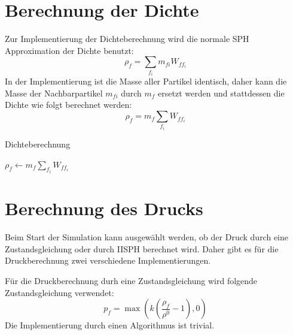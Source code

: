 \documentclass[11pt,
a4paper,
parskip=half, %
BCOR=10mm, %
english,
ngerman]{scrreprt}
\begin{document}
\section{Berechnung der Dichte}
Zur Implementierung der Dichteberechnung wird die normale SPH Approximation der Dichte benutzt:
\begin{equation}
    \rho_f = \sum_{f_i} m_{fi} W_{f f_i}
\end{equation}
In der Implementierung ist die Masse aller Partikel identisch, daher kann die Masse der Nachbarpartikel $m_{fi}$ durch $m_f$ ersetzt werden
und stattdessen die Dichte wie folgt berechnet werden:
\begin{equation}
    \rho_f = m_f \sum_{f_i} W_{f f_i}
\end{equation}

\begin{algorithm}
    \caption{Dichteberechnung}
    \label{alg:density}
    \begin{algorithmic}
            \State $\rho_f \gets m_f \sum_{f_i} W_{f f_i}$
        \EndFor
    \end{algorithmic}
\end{algorithm}

\section{Berechnung des Drucks}
Beim Start der Simulation kann ausgewählt werden, ob der Druck durch eine Zustandsgleichung oder durch IISPH berechnet wird.
Daher gibt es für die Druckberechnung zwei verschiedene Implementierungen.

Für die Druckberechnung durh eine Zustandsgleichung wird folgende Zustandsgleichung verwendet:
\begin{equation}
    p_f = \max\left(k \left(\frac{\rho_f}{\rho^0} - 1\right), 0\right)
\end{equation}
Die Implementierung durch einen Algorithmus ist trivial.

\end{document}
